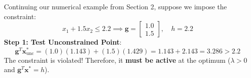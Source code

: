 \documentclass[11pt,a4paper]{article}
\begin{document}
\begin{examplebox}
Continuing our numerical example from Section 2, suppose we impose the constraint:
\begin{equation*}
x_1 + 1.5 x_2 \le 2.2 \implies \mathbf{g} = \begin{bmatrix} 1.0 \\ 1.5 \end{bmatrix}, \quad h = 2.2
\end{equation*}
\textbf{Step 1: Test Unconstrained Point}:
\begin{equation*}
\mathbf{g}^T \mathbf{x}^*_{\mathrm{unc}} = (1.0)(1.143) + (1.5)(1.429) = 1.143 + 2.143 = 3.286 > 2.2
\end{equation*}
The constraint is violated! Therefore, it \textbf{must be active} at the optimum ($\lambda > 0$ and $\mathbf{g}^T \mathbf{x}^* = h$).


\end{examplebox}
\end{document}
